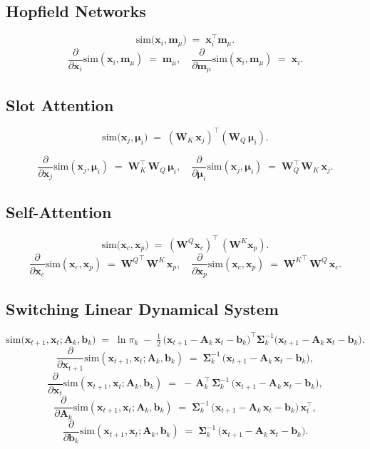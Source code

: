 \documentclass{article}
\begin{document}
\subsection*{Hopfield Networks}
\[
\mathrm{sim}\bigl(\bm{x}_i, \bm{m}_\mu\bigr)
\;=\;
\bm{x}_i^\top \bm{m}_\mu.
\]
\[
\frac{\partial}{\partial \bm{x}_i} \mathrm{sim}(\bm{x}_i,\bm{m}_\mu)
\;=\;
\bm{m}_\mu,
\quad
\frac{\partial}{\partial \bm{m}_\mu} \mathrm{sim}(\bm{x}_i,\bm{m}_\mu)
\;=\;
\bm{x}_i.
\]

\subsection*{Slot Attention}
\[
\mathrm{sim}\bigl(\bm{x}_j,\bm{\mu}_i\bigr)
\;=\;
(\bm{W}_K\,\bm{x}_j)^\top
(\bm{W}_Q\,\bm{\mu}_i).
\]

\[
\frac{\partial}{\partial \bm{x}_j} \mathrm{sim}(\bm{x}_j,\bm{\mu}_i)
\;=\;
\bm{W}_K^\top \,\bm{W}_Q\,\bm{\mu}_i,
\quad
\frac{\partial}{\partial \bm{\mu}_i} \mathrm{sim}(\bm{x}_j,\bm{\mu}_i)
\;=\;
\bm{W}_Q^\top \,\bm{W}_K\,\bm{x}_j.
\]

\subsection*{Self-Attention}
\[
\mathrm{sim}\bigl(\bm{x}_c,\bm{x}_p\bigr)
\;=\;
(\bm{W}^Q \bm{x}_c)^\top\,(\bm{W}^K \bm{x}_p).
\]
\[
\frac{\partial}{\partial \bm{x}_c} \mathrm{sim}(\bm{x}_c,\bm{x}_p)
\;=\;
{\bm{W}^Q}^\top\,\bm{W}^K\,\bm{x}_p,
\quad
\frac{\partial}{\partial \bm{x}_p} \mathrm{sim}(\bm{x}_c,\bm{x}_p)
\;=\;
{\bm{W}^K}^\top\,\bm{W}^Q\,\bm{x}_c.
\]

\subsection*{Switching Linear Dynamical System}
\[
\mathrm{sim}\bigl(\bm{x}_{t+1}, \bm{x}_t; \bm{A}_k, \bm{b}_k\bigr)
\;=\;
\ln \pi_k
\;-\;
\tfrac12\,\bigl(\bm{x}_{t+1} - \bm{A}_k\,\bm{x}_t - \bm{b}_k\bigr)^\top
\bm{\Sigma}_k^{-1}
\bigl(\bm{x}_{t+1} - \bm{A}_k\,\bm{x}_t - \bm{b}_k\bigr).
\]
\[
\frac{\partial}{\partial \bm{x}_{t+1}}\mathrm{sim}(\bm{x}_{t+1},\bm{x}_t;\bm{A}_k,\bm{b}_k)
\;=\;
\bm{\Sigma}_k^{-1}\,\bigl(\bm{x}_{t+1} - \bm{A}_k\,\bm{x}_t - \bm{b}_k\bigr),
\]
\[
\frac{\partial}{\partial \bm{x}_t}\mathrm{sim}(\bm{x}_{t+1},\bm{x}_t;\bm{A}_k,\bm{b}_k)
\;=\;
-\,\bm{A}_k^\top \,\bm{\Sigma}_k^{-1}\,\bigl(\bm{x}_{t+1} - \bm{A}_k\,\bm{x}_t - \bm{b}_k\bigr),
\]
\[
\frac{\partial}{\partial \bm{A}_k}\mathrm{sim}(\bm{x}_{t+1},\bm{x}_t;\bm{A}_k,\bm{b}_k)
\;=\;
\bm{\Sigma}_k^{-1}\,\bigl(\bm{x}_{t+1} - \bm{A}_k\,\bm{x}_t - \bm{b}_k\bigr)\,\bm{x}_t^\top,
\]
\[
\frac{\partial}{\partial \bm{b}_k}\mathrm{sim}(\bm{x}_{t+1},\bm{x}_t;\bm{A}_k,\bm{b}_k)
\;=\;
\bm{\Sigma}_k^{-1}\,\bigl(\bm{x}_{t+1} - \bm{A}_k\,\bm{x}_t - \bm{b}_k\bigr).
\]
\end{document}
